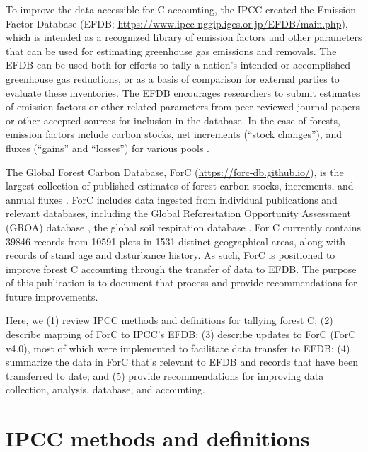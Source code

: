 \documentclass[, manuscript]{copernicus}
\begin{document}
To improve the data accessible for C accounting, the IPCC created the
Emission Factor Database (EFDB;
\url{https://www.ipcc-nggip.iges.or.jp/EFDB/main.php}), which is
intended as a recognized library of emission factors and other
parameters that can be used for estimating greenhouse gas emissions and
removals. The EFDB can be used both for efforts to tally a nation's
intended or accomplished greenhouse gas reductions, or as a basis of
comparison for external parties to evaluate these inventories. The EFDB
encourages researchers to submit estimates of emission factors or other
related parameters from peer-reviewed journal papers or other accepted
sources for inclusion in the database. In the case of forests, emission
factors include carbon stocks, net increments (``stock changes''), and
fluxes (``gains'' and ``losses'') for various pools
\citep{ipcc_2006_2006, ipcc_2019_2019}.

The Global Forest Carbon Database, ForC
(\url{https://forc-db.github.io/}), is the largest collection of
published estimates of forest carbon stocks, increments, and annual
fluxes
\citep{anderson-teixeira_forc_2018, anderson-teixeira_carbon_2021}. ForC
includes data ingested from individual publications and relevant
databases, including the Global Reforestation Opportunity Assessment
(GROA) database \citep[database doi:
10.5281/zenodo.3983644]{cook-patton_mapping_2020}, the global soil
respiration database
\citep[SRDB-V5,][]{bond-lamberty_global_2010, jian_restructured_2021}.
For C currently contains 39846 records from 10591 plots in 1531 distinct
geographical areas, along with records of stand age and disturbance
history. As such, ForC is positioned to improve forest C accounting
through the transfer of data to EFDB. The purpose of this publication is
to document that process and provide recommendations for future
improvements.

Here, we (1) review IPCC methods and definitions for tallying forest C;
(2) describe mapping of ForC to IPCC's EFDB; (3) describe updates to
ForC (ForC v4.0), most of which were implemented to facilitate data
transfer to EFDB; (4) summarize the data in ForC that's relevant to EFDB
and records that have been transferred to date; and (5) provide
recommendations for improving data collection, analysis, database, and
accounting.

\section{IPCC methods and definitions}
\end{document}
